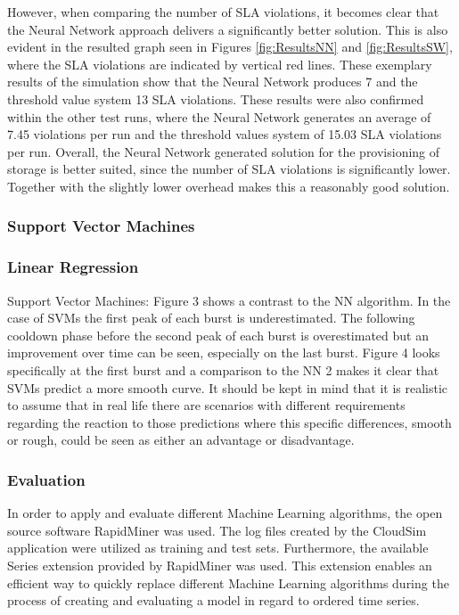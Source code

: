 However, when comparing the number of SLA violations, it becomes clear that the Neural Network approach delivers a significantly better solution. This is also evident in the resulted graph seen in Figures \ref{fig:ResultsNN} and \ref{fig:ResultsSW}, where the SLA violations are indicated by vertical red lines. These exemplary results of the simulation show that the Neural Network produces 7 and the threshold value system 13 SLA violations. These results were also confirmed within the other test runs, where the Neural Network generates an average of 7.45 violations per run and the threshold values system of 15.03 SLA violations per run. Overall, the Neural Network generated solution for the provisioning of storage is better suited, since the number of SLA violations is significantly lower. Together with the slightly lower overhead makes this a reasonably good solution.



\subsubsection{Support Vector Machines}\label{SVM}

\subsubsection{Linear Regression}\label{LReg}




Support Vector Machines: Figure 3 shows a contrast
to the NN algorithm. In the case of SVMs the first peak of
each burst is underestimated. The following cooldown phase
before the second peak of each burst is overestimated but
an improvement over time can be seen, especially on the
last burst. Figure 4 looks specifically at the first burst and
a comparison to the NN 2 makes it clear that SVMs predict a
more smooth curve. It should be kept in mind that it is realistic
to assume that in real life there are scenarios with different
requirements regarding the reaction to those predictions where
this specific differences, smooth or rough, could be seen as
either an advantage or disadvantage.






\subsubsection{Evaluation}\label{MLeval}
In order to apply and evaluate different Machine Learning algorithms, the open source software RapidMiner \cite{rapidminer} was used. The log files created by the CloudSim application were utilized as training and test sets. Furthermore, the available Series extension provided by RapidMiner was used. This extension enables an efficient way to quickly replace different Machine Learning algorithms during the process of creating and evaluating a model in regard to ordered time series.

